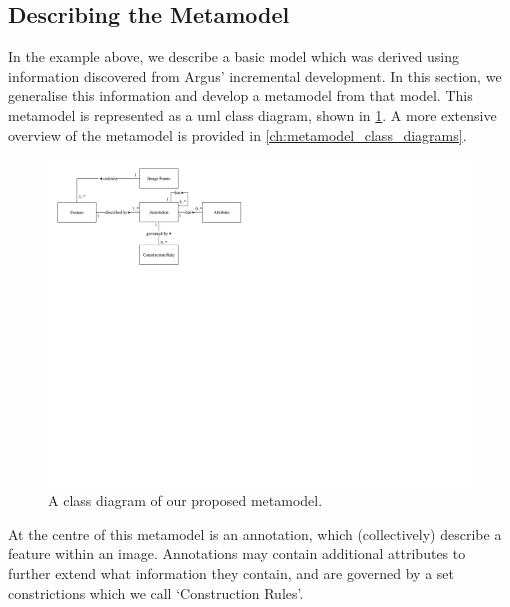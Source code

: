 \subsection{Describing the Metamodel}
\label{sec:dataset:architecture:metamodel}


In the example above, we describe a basic model which was derived using information discovered from Argus' incremental development. In this section, we generalise this information and develop a metamodel from that model. This metamodel is represented as a \gls{uml} class diagram, shown in \cref{fig:dataset:metamodel_class_diagram}. A more extensive overview of the metamodel is provided in \cref{ch:metamodel_class_diagrams}.

\begin{figure}[h]
  \centering
  \includegraphics[width=\textwidth]{images/dataset/metamodel_class_diagram}
  \caption[Class diagram of our proposed metamodel]{A class diagram of our proposed metamodel.}
  \label{fig:dataset:metamodel_class_diagram}
\end{figure}

At the centre of this metamodel is an annotation, which (collectively) describe a feature within an image. Annotations may contain additional attributes to further extend what information they contain, and are governed by a set constrictions which we call `Construction Rules'.

